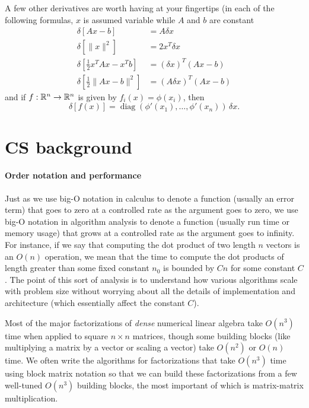 \documentclass[12pt, leqno]{article}
\begin{document}
A few other derivatives are worth having at your fingertips
(in each of the following formulas, $x$ is assumed variable
while $A$ and $b$ are constant
\begin{align*}
  \delta [Ax-b] &= A \delta x \\
  \delta [\|x\|^2] &= 2 x^T \delta x \\
  \delta \left[\frac{1}{2} x^T A x - x^T b\right] &= (\delta x)^T (Ax-b) \\
  \delta \left[\frac{1}{2} \|Ax-b\|^2 \right] &= (A \delta x)^T (Ax-b)
\end{align*}
and if $f : \mathbb{R}^n \rightarrow \mathbb{R}^n$ is given by $f_i(x) = \phi(x_i)$,
then
\[
  \delta [f(x)] = \operatorname{diag}(\phi'(x_1), \ldots, \phi'(x_n))
  \, \delta x.
\]


\section{CS background}

\paragraph{Order notation and performance}
Just as we use big-O notation in calculus to denote a function
(usually an error term) that goes to zero at a controlled rate as the
argument goes to zero, we use big-O notation in algorithm analysis to
denote a function (usually run time or memory usage) that grows at a
controlled rate as the argument goes to infinity.  For instance,
if we say that computing the dot product of two length $n$ vectors
is an $O(n)$ operation, we mean that the time to compute the dot
products of length greater than some fixed constant $n_0$ is bounded
by $C n$ for some constant $C$.  The point of this sort of analysis
is to understand how various algorithms scale with problem size
without worrying about all the details of implementation and
architecture (which essentially affect the constant $C$).

Most of the major factorizations of {\em dense} numerical linear
algebra take $O(n^3)$ time when applied to square $n \times n$
matrices, though some building blocks (like multiplying a matrix
by a vector or scaling a vector) take $O(n^2)$ or $O(n)$ time.
We often write the algorithms for factorizations that take $O(n^3)$
time using block matrix notation so that we can build these
factorizations from a few well-tuned $O(n^3)$ building blocks,
the most important of which is matrix-matrix multiplication.
\end{document}
